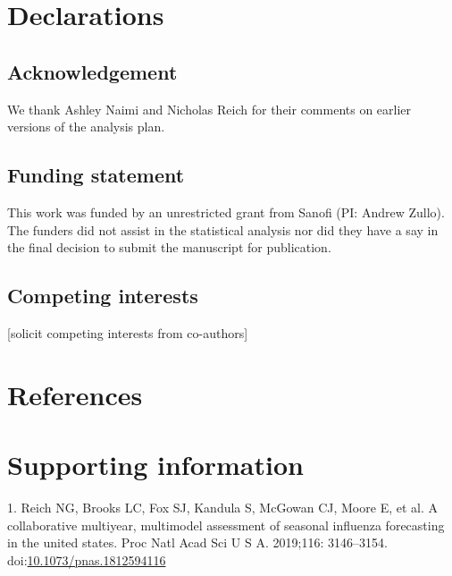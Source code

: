 \documentclass[10pt,letterpaper]{article}
\begin{document}
\hypertarget{declarations}{%
\section{Declarations}\label{declarations}}

\hypertarget{acknowledgement}{%
\subsection{Acknowledgement}\label{acknowledgement}}

We thank Ashley Naimi and Nicholas Reich for their comments on earlier
versions of the analysis plan.

\hypertarget{funding-statement}{%
\subsection{Funding statement}\label{funding-statement}}

This work was funded by an unrestricted grant from Sanofi (PI: Andrew
Zullo). The funders did not assist in the statistical analysis nor did
they have a say in the final decision to submit the manuscript for
publication.

\hypertarget{competing-interests}{%
\subsection{Competing interests}\label{competing-interests}}

{[}solicit competing interests from co-authors{]}

\hypertarget{references}{%
\section*{References}\label{references}}



\hypertarget{supporting-information}{%
\section*{Supporting information}\label{supporting-information}}

\hypertarget{refs}{}
\leavevmode\hypertarget{ref-Reich2019-uk}{}%
1. Reich NG, Brooks LC, Fox SJ, Kandula S, McGowan CJ, Moore E, et al. A
collaborative multiyear, multimodel assessment of seasonal influenza
forecasting in the united states. Proc Natl Acad Sci U S A. 2019;116:
3146--3154.
doi:\href{https://doi.org/10.1073/pnas.1812594116}{10.1073/pnas.1812594116}
\end{document}
